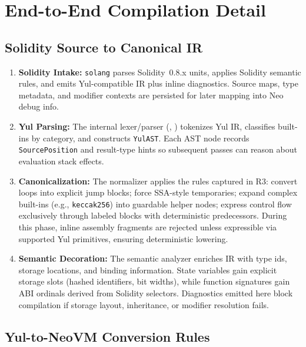 \documentclass[11pt]{article}
\begin{document}
\section{End-to-End Compilation Detail}

\subsection{Solidity Source to Canonical IR}
\begin{enumerate}
    \item \textbf{Solidity Intake:} \texttt{solang} parses Solidity~0.8.x units, applies Solidity semantic rules, and emits Yul-compatible IR plus inline diagnostics. Source maps, type metadata, and modifier contexts are persisted for later mapping into Neo debug info.
    \item \textbf{Yul Parsing:} The internal lexer/parser (, ) tokenizes Yul IR, classifies built-ins by category, and constructs \texttt{YulAST}. Each AST node records \texttt{SourcePosition} and result-type hints so subsequent passes can reason about evaluation stack effects.
    \item \textbf{Canonicalization:} The normalizer applies the rules captured in R3: convert loops into explicit jump blocks; force SSA-style temporaries; expand complex built-ins (e.g., \texttt{keccak256}) into guardable helper nodes; express control flow exclusively through labeled blocks with deterministic predecessors. During this phase, inline assembly fragments are rejected unless expressible via supported Yul primitives, ensuring deterministic lowering.
    \item \textbf{Semantic Decoration:} The semantic analyzer enriches IR with type ids, storage locations, and binding information. State variables gain explicit storage slots (hashed identifiers, bit widths), while function signatures gain ABI ordinals derived from Solidity selectors. Diagnostics emitted here block compilation if storage layout, inheritance, or modifier resolution fails.
\end{enumerate}

\subsection{Yul-to-NeoVM Conversion Rules}
\end{document}

